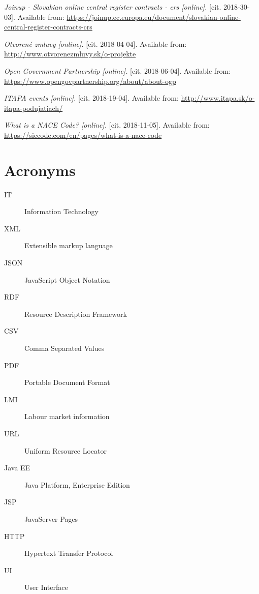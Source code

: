 \documentclass[thesis=B,english]{FITthesis}[2012/06/26]
\begin{document}
{\begin{thebibliography}{9}
\textit{Joinup - Slovakian online central register contracts - crs [online].}
[cit. 2018-30-03]. Available from: \url{https://joinup.ec.europa.eu/document/slovakian-online-central-register-contracts-crs}

\textit{Otvorené zmluvy [online].}
[cit. 2018-04-04]. Available from: \url{http://www.otvorenezmluvy.sk/o-projekte}

\textit{Open Government Partnership [online].}
[cit. 2018-06-04]. Available from: \url{https://www.opengovpartnership.org/about/about-ogp}

\textit{ITAPA events [online].}
[cit. 2018-19-04]. Available from: \url{http://www.itapa.sk/o-itapa-podujatiach/}

\textit{What is a NACE Code? [online].}
[cit. 2018-11-05]. Available from: \url{https://siccode.com/en/pages/what-is-a-nace-code}

\end{thebibliography}

\chapter{Acronyms}
\begin{description}
	\item[IT] Information Technology
	\item[XML] Extensible markup language
	\item[JSON] JavaScript Object Notation
	\item[RDF] Resource Description Framework
	\item[CSV] Comma Separated Values
	\item[PDF] Portable Document Format
	\item[LMI] Labour market information
	\item[URL] Uniform Resource Locator
	\item[Java EE] Java Platform, Enterprise Edition
	\item[JSP] JavaServer Pages
	\item[HTTP] Hypertext Transfer Protocol
	\item[UI] User Interface
\end{description}

}
\end{document}
